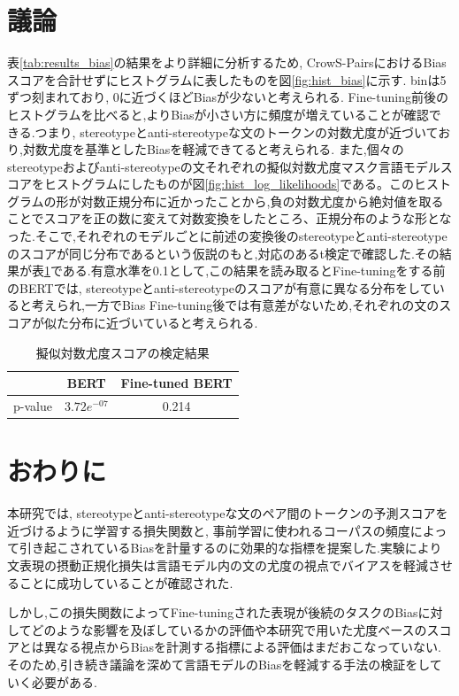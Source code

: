 \documentclass[
  platex, dvipdfmx %
]{nlp2021}
\begin{document}
\section{議論}
表\ref{tab:results_bias}の結果をより詳細に分析するため, CrowS-PairsにおけるBiasスコアを合計せずにヒストグラムに表したものを図\ref{fig:hist_bias}に示す. binは5ずつ刻まれており, 0に近づくほどBiasが少ないと考えられる. Fine-tuning前後のヒストグラムを比べると,よりBiasが小さい方に頻度が増えていることが確認できる.つまり, stereotypeとanti-stereotypeな文のトークンの対数尤度が近づいており,対数尤度を基準としたBiasを軽減できてると考えられる.
また,個々のstereotypeおよびanti-stereotypeの文それぞれの擬似対数尤度マスク言語モデルスコアをヒストグラムにしたものが図\ref{fig:hist_log_likelihoods}である。このヒストグラムの形が対数正規分布に近かったことから,負の対数尤度から絶対値を取ることでスコアを正の数に変えて対数変換をしたところ、正規分布のような形となった.そこで,それぞれのモデルごとに前述の変換後のstereotypeとanti-stereotypeのスコアが同じ分布であるという仮説のもと,対応のあるt検定で確認した.その結果が表\ref{tab:t_bias_scores}である.有意水準を0.1として,この結果を読み取るとFine-tuningをする前のBERTでは, stereotypeとanti-stereotypeのスコアが有意に異なる分布をしていると考えられ,一方でBias Fine-tuning後では有意差がないため,それぞれの文のスコアが似た分布に近づいていると考えられる.

\begin{table}[h]
\centering
\begin{tabular}{lcc}
\hline
 &  BERT & Fine-tuned BERT \\
\hline
p-value & $3.72e^{-07}$ &  0.214 \\
\hline
\end{tabular}
\caption{擬似対数尤度スコアの検定結果}
\label{tab:t_bias_scores}
\end{table}

\section{おわりに}
本研究では, stereotypeとanti-stereotypeな文のペア間のトークンの予測スコアを近づけるように学習する損失関数と, 事前学習に使われるコーパスの頻度によって引き起こされているBiasを計量するのに効果的な指標を提案した.実験により文表現の摂動正規化損失は言語モデル内の文の尤度の視点でバイアスを軽減させることに成功していることが確認された.

しかし,この損失関数によってFine-tuningされた表現が後続のタスクのBiasに対してどのような影響を及ぼしているかの評価や本研究で用いた尤度ベースのスコアとは異なる視点からBiasを計測する指標による評価はまだおこなっていない.そのため,引き続き議論を深めて言語モデルのBiasを軽減する手法の検証をしていく必要がある.

\clearpage




\end{document}
